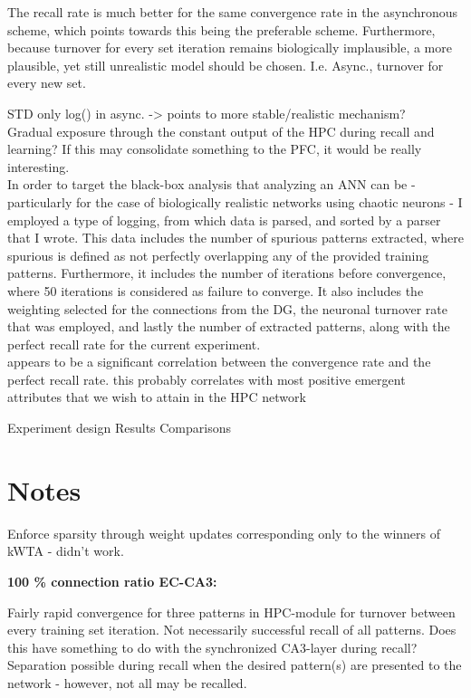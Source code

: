 The recall rate is much better for the same convergence rate in the asynchronous scheme, which points towards this being the preferable scheme. Furthermore, because turnover for every set iteration remains biologically implausible, a more plausible, yet still unrealistic model should be chosen. I.e. Async., turnover for every new set.

STD only log() in async. -> points to more stable/realistic mechanism?
\\

Gradual exposure through the constant output of the HPC during recall and learning? If this may consolidate something to the PFC, it would be really interesting.
\\

In order to target the black-box analysis that analyzing an ANN can be - particularly for the case of biologically realistic networks using chaotic neurons - I employed a type of logging, from which data is parsed, and sorted by a parser that I wrote. This data includes the number of spurious patterns extracted, where spurious is defined as not perfectly overlapping any of the provided training patterns. Furthermore, it includes the number of iterations before convergence, where 50 iterations is considered as failure to converge. It also includes the weighting selected for the connections from the DG, the neuronal turnover rate that was employed, and lastly the number of extracted patterns, along with the perfect recall rate for the current experiment.
\\

appears to be a significant correlation between the convergence rate and the perfect recall rate. this probably correlates with most positive emergent attributes that we wish to attain in the HPC network


Experiment design
Results
Comparisons

\section*{Notes}

Enforce sparsity through weight updates corresponding only to the winners of kWTA - didn't work.

\textbf{100 \% connection ratio EC-CA3:}

Fairly rapid convergence for three patterns in HPC-module for turnover between every training set iteration. 
Not necessarily successful recall of all patterns. Does this have something to do with the synchronized CA3-layer during recall? Separation possible during recall when the desired pattern(s) are presented to the network - however, not all may be recalled.

